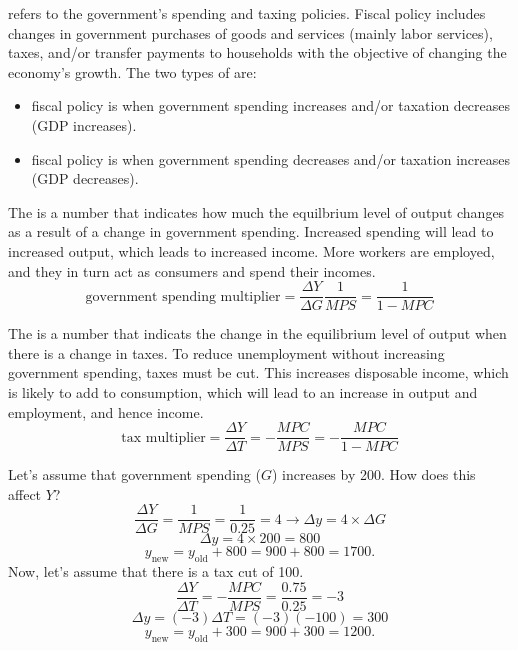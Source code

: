 \documentclass{article}
\begin{document}
\begin{definition}
  refers to the government's spending and taxing policies. Fiscal policy includes changes in government purchases of goods and services (mainly labor services), taxes, and/or transfer payments to households with the objective of changing the economy's growth. The two types of  are: 
  \begin{itemize}
    \item {} fiscal policy is when government spending increases and/or taxation decreases (GDP increases). 
    \item {} fiscal policy is when government spending decreases and/or taxation increases (GDP decreases). 
  \end{itemize}
\end{definition}

The  is a number that indicates how much the equilbrium level of output changes as a result of a change in government spending. Increased spending will lead to increased output, which leads to increased income. More workers are employed, and they in turn act as consumers and spend their incomes. $$\textrm{government spending multiplier} = \frac{\Delta Y}{\Delta G} \frac{1}{MPS} = \frac{1}{1-MPC}$$

The  is a number that indicats the change in the equilibrium level of output when there is a change in taxes. To reduce unemployment without increasing government spending, taxes must be cut. This increases disposable income, which is likely to add to consumption, which will lead to an increase in output and employment, and hence income. $$\textrm{tax multiplier} = \frac{\Delta Y}{\Delta T} = - \frac{MPC}{MPS} = - \frac{MPC}{1-MPC}$$

\begin{example}
  Let's assume that government spending ($G$) increases by 200. How does this affect $Y$?
  $$\frac{\Delta Y}{\Delta G} = \frac{1}{MPS} = \frac{1}{0.25} = 4 \rightarrow \Delta y = 4 \times \Delta G$$ 
  $$\Delta y = 4 \times 200 = 800$$
  $$y_{\textrm{new}} = y_{\textrm{old}} + 800 = 900 + 800 = 1700.$$
  Now, let's assume that there is a tax cut of 100. 
  $$\frac{\Delta Y}{\Delta T} = - \frac{MPC}{MPS} = \frac{0.75}{0.25} = -3$$
  $$\Delta y = (-3) \Delta T = (-3)(-100) = 300$$
  $$y_{\textrm{new}} = y_{\textrm{old}} + 300 = 900 + 300 = 1200.$$
\end{example}
\end{document}
